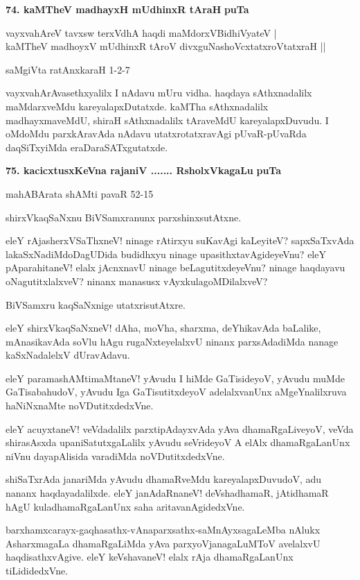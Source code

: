 \eject

\noindent
\textbf{74. kaMTheV madhayxH mUdhinxR tAraH} \hfill{\bf puTa }

\begin{shloka}
vayxvahAreV tavxsw terxVdhA haqdi maMdorxVBidhiVyateV |\\
kaMTheV madhoyxV mUdhinxR tAroV divxguNashoVcxtatxroVtatxraH ||
\end{shloka}

\hfill{saMgiVta ratAnxkaraH 1-2-7}

\smallskip
vayxvahArAvasethxyalilx I nAdavu mUru vidha. haqdaya sAthxnadalilx maMdarxveMdu kareyalapxDutatxde. kaMTha sAthxnadalilx madhayxmaveMdU, shiraH sAthxnadalilx tAraveMdU kareyalapxDuvudu. I oMdoMdu parxkAravAda nAdavu utatxrotatxravAgi pUvaR-pUvaRda daqSiTxyiMda eraDaraSATxgutatxde.

\medskip
\noindent
\textbf{75. kacicxtusxKeVna rajaniV ....... RsholxVkagaLu} \hfill{\bf puTa }

\hfill{mahABArata shAMti pavaR 52-15}

\smallskip
shirxVkaqSaNxnu BiVSamxranunx parxshinxsutAtxne.

eleY rAjasherxVSaThxneV! ninage rAtirxyu suKavAgi kaLeyiteV? sapxSaTxvAda lakaSxNadiMdoDagUDida budidhxyu ninage upasithxtavAgideyeVnu? eleY pAparahitaneV! elalx jAcnxnavU ninage beLagutitxdeyeVnu? ninage haqdayavu oNagutitxlalxveV? ninanx manasusx vAyxkulagoMDilalxveV?

BiVSamxru kaqSaNxnige utatxrisutAtxre.

eleY shirxVkaqSaNxneV! dAha, moVha, sharxma, deYhikavAda baLalike, mAnasikavAda soVlu hAgu rugaNxteyelalxvU ninanx parxsAdadiMda nanage kaSxNadalelxV dUravAdavu.

eleY paramashAMtimaMtaneV! yAvudu I hiMde GaTisideyoV, yAvudu muMde GaTisabahudoV, yAvudu Iga GaTisutitxdeyoV adelalxvanUnx aMgeYnalilxruva haNiNxnaMte noVDutitxdedxVne.

eleY acuyxtaneV! veVdadalilx parxtipAdayxvAda yAva dhamaRgaLiveyoV, veVda shirasAsxda upaniSatutxgaLalilx yAvudu seVrideyoV A elAlx dhamaRgaLanUnx niVnu dayapAlisida varadiMda noVDutitxdedxVne.

shiSaTxrAda janariMda yAvudu dhamaRveMdu kareyalapxDuvudoV, adu nananx haqdayadalilxde. eleY janAdaRnaneV! deVshadhamaR, jAtidhamaR hAgU kuladhamaRgaLanUnx saha aritavanAgidedxVne.

barxhamxcarayx-gaqhasathx-vAnaparxsathx-saMnAyxsagaLeMba nAlukx AsharxmagaLa dhamaRgaLiMda yAva parxyoVjanagaLuMToV avelalxvU haqdisathxvAgive. eleY keVshavaneV! elalx rAja dhamaRgaLanUnx tiLididedxVne.

